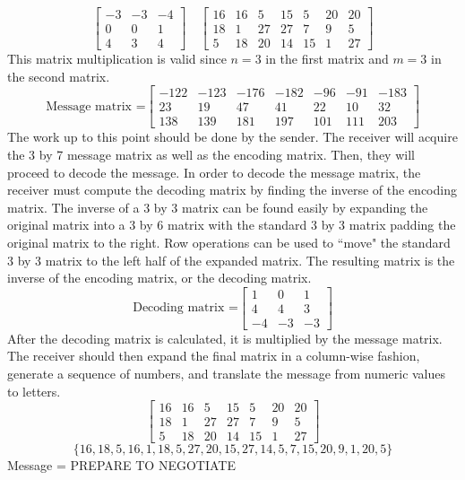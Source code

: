 \documentclass{article}
\begin{document}
$$
\begin{bmatrix}
-3 & -3 & -4 \\
0 & 0 & 1 \\
4 & 3 & 4 
\end{bmatrix}
\quad
\begin{bmatrix}
16 & 16 & 5 & 15 & 5 & 20 & 20 \\
18 & 1 & 27 & 27 & 7 & 9 & 5 \\
5 & 18 & 20 & 14 & 15 & 1 & 27
\end{bmatrix}
$$
This matrix multiplication is valid since $n=3$ in the first matrix and $m=3$ in the second matrix.
$$\text{Message matrix =}
\begin{bmatrix}
-122 & -123 & -176 & -182 & -96 & -91 & -183 \\
23 & 19 & 47 & 41 & 22 & 10 & 32 \\
138 & 139 & 181 & 197 & 101 & 111 & 203
\end{bmatrix}
$$
The work up to this point should be done by the sender. The receiver will acquire the 3 by 7 message matrix as well as the encoding matrix. Then, they will proceed to decode the message. In order to decode the message matrix, the receiver must compute the decoding matrix by finding the inverse of the encoding matrix. The inverse of a 3 by 3 matrix can be found easily by expanding the original matrix into a 3 by 6 matrix with the standard 3 by 3 matrix padding the original matrix to the right. Row operations can be used to ``move" the standard 3 by 3 matrix to the left half of the expanded matrix. The resulting matrix is the inverse of the encoding matrix, or the decoding matrix.
$$\text{Decoding matrix =}
\begin{bmatrix}
1 & 0 & 1 \\
4 & 4 & 3 \\
-4 & -3 & -3
\end{bmatrix}
$$
After the decoding matrix is calculated, it is multiplied by the message matrix. The receiver should then expand the final matrix in a column-wise fashion, generate a sequence of numbers, and translate the message from numeric values to letters.
$$
\begin{bmatrix}
16 & 16 & 5 & 15 & 5 & 20 & 20 \\
18 & 1 & 27 & 27 & 7 & 9 & 5 \\
5 & 18 & 20 & 14 & 15 & 1 & 27
\end{bmatrix}
$$
$$
\{16, 18, 5, 16, 1, 18, 5, 27, 20, 15, 27, 14, 5, 7, 15, 20, 9, 1, 20, 5\}
$$
{\center
Message = PREPARE TO NEGOTIATE
\endcenter}
\end{document}
